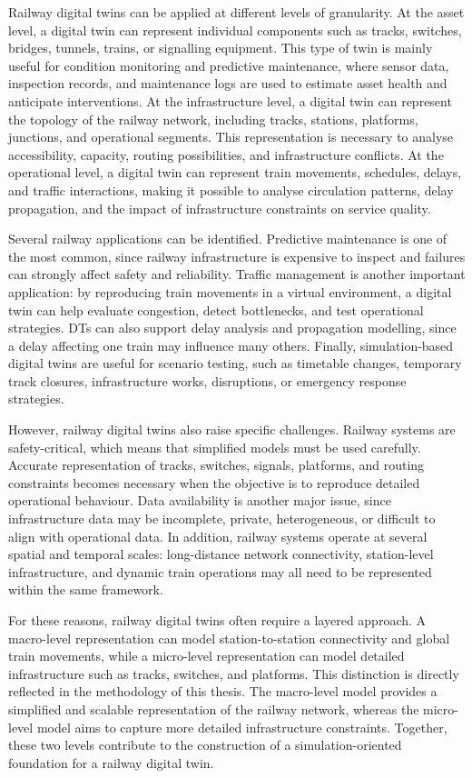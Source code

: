 Railway digital twins can be applied at different levels of granularity. At the asset level, a digital twin can represent 
individual components such as tracks, switches, bridges, tunnels, trains, or signalling equipment. This type of twin is 
mainly useful for condition monitoring and predictive maintenance, where sensor data, inspection records, and maintenance 
logs are used to estimate asset health and anticipate interventions. At the infrastructure level, a digital twin can 
represent the topology of the railway network, including tracks, stations, platforms, junctions, and operational segments. 
This representation is necessary to analyse accessibility, capacity, routing possibilities, and infrastructure conflicts. 
At the operational level, a digital twin can represent train movements, schedules, delays, and traffic interactions, 
making it possible to analyse circulation patterns, delay propagation, and the impact of infrastructure constraints on 
service quality.

Several railway applications can be identified. Predictive maintenance is one of the most common, since railway 
infrastructure is expensive to inspect and failures can strongly affect safety and reliability. Traffic management is 
another important application: by reproducing train movements in a virtual environment, a digital twin can help evaluate 
congestion, detect bottlenecks, and test operational strategies. DTs can also support delay analysis and propagation 
modelling, since a delay affecting one train may influence many others. Finally, simulation-based digital twins are useful 
for scenario testing, such as timetable changes, temporary track closures, infrastructure works, disruptions, or emergency 
response strategies.

However, railway digital twins also raise specific challenges. Railway systems are safety-critical, which means that 
simplified models must be used carefully. Accurate representation of tracks, switches, signals, platforms, and routing 
constraints becomes necessary when the objective is to reproduce detailed operational behaviour. Data availability is 
another major issue, since infrastructure data may be incomplete, private, heterogeneous, or difficult to align with 
operational data. In addition, railway systems operate at several spatial and temporal scales: long-distance network 
connectivity, station-level infrastructure, and dynamic train operations may all need to be represented within the same 
framework.

For these reasons, railway digital twins often require a layered approach. A macro-level representation can model 
station-to-station connectivity and global train movements, while a micro-level representation can model detailed 
infrastructure such as tracks, switches, and platforms. This distinction is directly reflected in the methodology of this 
thesis. The macro-level model provides a simplified and scalable representation of the railway network, whereas the 
micro-level model aims to capture more detailed infrastructure constraints. Together, these two levels contribute to the 
construction of a simulation-oriented foundation for a railway digital twin.

